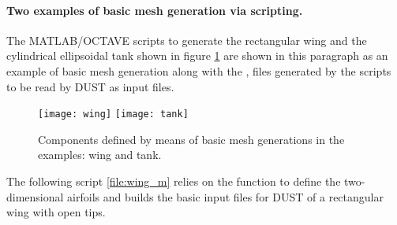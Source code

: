 \paragraph{Two examples of basic mesh generation via scripting.}
The MATLAB/OCTAVE scripts to generate the rectangular wing and the cylindrical ellipsoidal tank 
shown in figure \ref{fig:basic_components_example} are shown in this paragraph as an example of 
basic mesh generation along with the ,  files generated by the scripts 
to be read by DUST as input files.
\newline
\begin{figure}[h]
\centering
\texttt{[image: wing]} \hspace{30pt}
\texttt{[image: tank]}
\caption{Components defined by means of basic mesh generations in the examples: wing and tank.}
\label{fig:basic_components_example}
\end{figure}
\newline
The following script \ref{file:wing_m} relies on the function  to define the two-dimensional 
airfoils and builds the basic input files for DUST of a rectangular wing with open tips.
